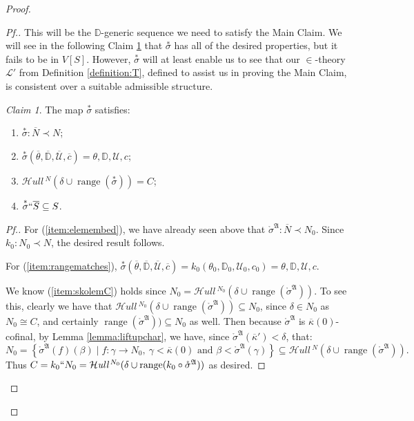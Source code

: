\documentclass{amsart}
\theoremstyle{definition}
\theoremstyle{remark}
\newtheorem{claimno}{Claim}
\newcommand{\D}{\mathbb{D}}
\newcommand{\N}{{\overline{N}}}
\renewcommand{\S}{{\overline{S}}}
\newcommand{\U}{\mathcal{U}}
\DeclareMathOperator{\ran}{range}
\newcommand{\st}{\; | \;}
\newcommand{\set}[2]{\left\{#1\st #2 \right\}}
\newcommand{\SH}{\mathcal{H}\textit{ull} \,}
\newcommand{\sk}[3]{\SH^{#1}( {#2} \cup {\ran(#3)} ) }
\begin{document}
\begin{proof}
\begin{proof}[Pf.]
This will be the $\D$-generic sequence we need to satisfy the Main Claim. We will see in the following Claim \ref{claim:starsigmaisgood} that $\overset{*} \sigma$ has all of the desired properties, but it fails to be in $V[S]$. However, $\overset{*}{\sigma}$ will at least enable us to see that our $\in$-theory $\mathcal L'$ from Definition \ref{definition:T}, defined to assist us in proving the Main Claim, is consistent over a suitable admissible structure.
\begin{claimno} \label{claim:starsigmaisgood} The map $\overset{*}{\sigma}$ satisfies:
\begin{enumerate}
	\item \label{item:elemembed} $\overset{*} {\sigma}: \N \prec N$;
	\item \label{item:rangematches} $\overset{*} {\sigma}(\overline \theta, \overline{\D}, \overline{\U}, \overline c)=\theta, \D, \U, c$;
	\item \label{item:skolemC} $\sk{N}{\delta}{\overset{*}{\sigma}} = C$;	
	\item \label{item:lifts} $\overset{*} {\sigma} `` \S \subseteq S$.
\end{enumerate}
\end{claimno}
\begin{proof}[Pf.]
For (\ref{item:elemembed}), we have already seen above that $\mathring \sigma^{\mathfrak A}: \N \prec N_0$. Since $k_0:N_0 \prec N$, the desired result follows.

For (\ref{item:rangematches}), $\overset{*} {\sigma}(\overline \theta, \overline{\D}, \overline{\U}, \overline c)= k_0(\theta_0, \D_0, \U_0, c_0) =\theta, \D, \U, c$.

We know (\ref{item:skolemC}) holds since $N_0 = \sk{N_0}{\delta}{\mathring \sigma^{\mathfrak A}}$. To see this, clearly we have that $\sk{N_0}{\delta}{\mathring \sigma^{\mathfrak A}} \subseteq N_0$, since $\delta \in N_0$ as $N_0 \cong C$, and certainly $\ran(\mathring \sigma^{\mathfrak A})) \subseteq N_0$ as well. 
Then because $\mathring \sigma^{\mathfrak A}$ is $\overline \kappa(0)$-cofinal, by Lemma \ref{lemma:liftupchar}, we have, since $\mathring \sigma^{\mathfrak A}(\overline \kappa') < \delta$, that:
$$N_0 = \set{\mathring \sigma^{\mathfrak A}(f)(\beta)}{ f: \gamma \longrightarrow N_0, \ \gamma < \overline \kappa(0) \text{ and } \beta < \mathring \sigma^{\mathfrak A}(\gamma) } \subseteq \sk{N}{\delta}{\mathring \sigma^{\mathfrak A}}.$$
Thus $C = k_0``N_0=\sk{N_0}{\delta}{k_0 \circ \mathring \sigma^{\mathfrak A}}$ as desired. 


\end{proof}
\end{proof}
\end{proof}
\end{document}
